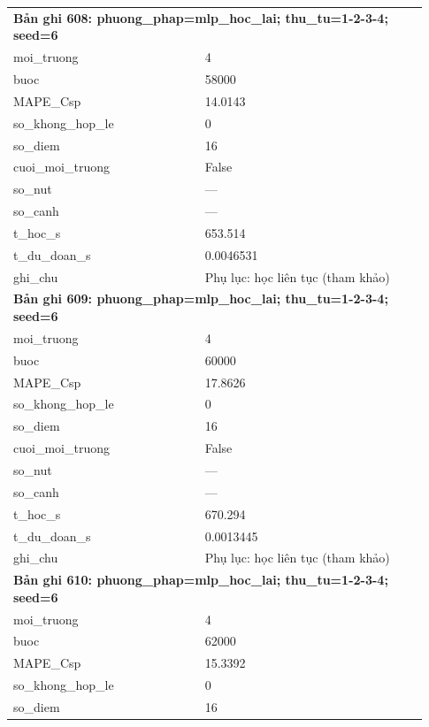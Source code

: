 \begin{longtable}{p{0.43\linewidth}p{0.50\linewidth}}
\midrule
\multicolumn{2}{p{0.95\linewidth}}{\textbf{Bản ghi 608: phuong\_phap=mlp\_hoc\_lai; thu\_tu=1-2-3-4; seed=6}} \\
moi\_\allowbreak truong & 4 \\
buoc & 58000 \\
MAPE\_\allowbreak Csp & 14.0143 \\
so\_\allowbreak khong\_\allowbreak hop\_\allowbreak le & 0 \\
so\_\allowbreak diem & 16 \\
cuoi\_\allowbreak moi\_\allowbreak truong & False \\
so\_\allowbreak nut & — \\
so\_\allowbreak canh & — \\
t\_\allowbreak hoc\_\allowbreak s & 653.514 \\
t\_\allowbreak du\_\allowbreak doan\_\allowbreak s & 0.0046531 \\
ghi\_\allowbreak chu & Phụ lục: học liên tục (tham khảo) \\
\midrule
\multicolumn{2}{p{0.95\linewidth}}{\textbf{Bản ghi 609: phuong\_phap=mlp\_hoc\_lai; thu\_tu=1-2-3-4; seed=6}} \\
moi\_\allowbreak truong & 4 \\
buoc & 60000 \\
MAPE\_\allowbreak Csp & 17.8626 \\
so\_\allowbreak khong\_\allowbreak hop\_\allowbreak le & 0 \\
so\_\allowbreak diem & 16 \\
cuoi\_\allowbreak moi\_\allowbreak truong & False \\
so\_\allowbreak nut & — \\
so\_\allowbreak canh & — \\
t\_\allowbreak hoc\_\allowbreak s & 670.294 \\
t\_\allowbreak du\_\allowbreak doan\_\allowbreak s & 0.0013445 \\
ghi\_\allowbreak chu & Phụ lục: học liên tục (tham khảo) \\
\midrule
\multicolumn{2}{p{0.95\linewidth}}{\textbf{Bản ghi 610: phuong\_phap=mlp\_hoc\_lai; thu\_tu=1-2-3-4; seed=6}} \\
moi\_\allowbreak truong & 4 \\
buoc & 62000 \\
MAPE\_\allowbreak Csp & 15.3392 \\
so\_\allowbreak khong\_\allowbreak hop\_\allowbreak le & 0 \\
so\_\allowbreak diem & 16 \\

\end{longtable}
